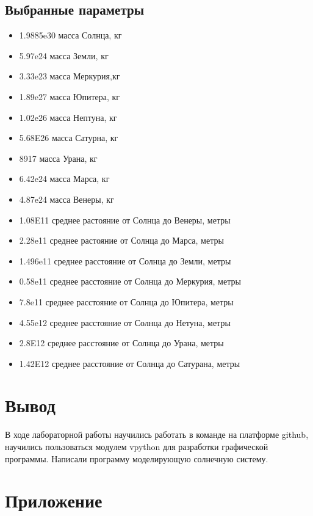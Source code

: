 \documentclass[12pt,a4paper]{extarticle}
\begin{document}
\subsection{Выбранные параметры}
\begin{itemize}
\item 1.9885e30   масса Солнца, кг
\item 5.97e24   масса Земли, кг
\item 3.33e23  масса Меркурия,кг
\item 1.89e27  масса Юпитера, кг
\item 1.02e26  масса Нептуна, кг
\item 5.68E26  масса Сатурна, кг
\item 8917  масса Урана, кг
\item 6.42e24  масса Марса, кг
\item 4.87e24  масса Венеры, кг
\item 1.08E11 среднее растояние от Солнца до Венеры, метры 
\item  2.28e11 среднее растояние от Солнца до Марса, метры 
\item  1.496e11   среднее расстояние от Солнца до Земли, метры
\item  0.58e11  среднее расстояние от Солнца до Меркурия, метры
\item  7.8e11   среднее расстояние от Солнца до Юпитера, метры
\item  4.55e12   среднее расстояние от Солнца до Нетуна, метры
\item  2.8E12  среднее расстояние от Солнца до Урана, метры
\item  1.42E12  среднее расстояние от Солнца до Сатурана, метры
\end{itemize}
\label{sec:longtermgoals}

\section{Вывод}
В ходе лабораторной работы научились работать в команде на платформе github, научились пользоваться модулем vpython для разработки графической программы. Написали программу моделирующую солнечную систему. 


\newpage
\section*{Приложение}
\end{document}
